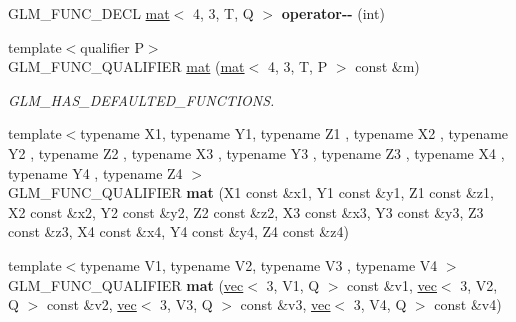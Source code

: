 \begin{DoxyCompactItemize}
G\+L\+M\+\_\+\+F\+U\+N\+C\+\_\+\+D\+E\+CL \hyperlink{structglm_1_1mat}{mat}$<$ 4, 3, T, Q $>$ {\bfseries operator-\/-\/} (int)
\item 
\mbox{\label{structglm_1_1mat_3_014_00_013_00_01T_00_01Q_01_4_af535eb7ce78a7ae068672295b3f5390b}} 
{\footnotesize template$<$qualifier P$>$ }\\G\+L\+M\+\_\+\+F\+U\+N\+C\+\_\+\+Q\+U\+A\+L\+I\+F\+I\+ER \hyperlink{structglm_1_1mat_3_014_00_013_00_01T_00_01Q_01_4_af535eb7ce78a7ae068672295b3f5390b}{mat} (\hyperlink{structglm_1_1mat}{mat}$<$ 4, 3, T, P $>$ const \&m)
\begin{DoxyCompactList}\small\item\em G\+L\+M\+\_\+\+H\+A\+S\+\_\+\+D\+E\+F\+A\+U\+L\+T\+E\+D\+\_\+\+F\+U\+N\+C\+T\+I\+O\+NS. \end{DoxyCompactList}\item 
\mbox{\label{structglm_1_1mat_3_014_00_013_00_01T_00_01Q_01_4_a5b9b02c2c06734a82ab34e55ae7b0888}} 
{\footnotesize template$<$typename X1, typename Y1, typename Z1 , typename X2 , typename Y2 , typename Z2 , typename X3 , typename Y3 , typename Z3 , typename X4 , typename Y4 , typename Z4 $>$ }\\G\+L\+M\+\_\+\+F\+U\+N\+C\+\_\+\+Q\+U\+A\+L\+I\+F\+I\+ER {\bfseries mat} (X1 const \&x1, Y1 const \&y1, Z1 const \&z1, X2 const \&x2, Y2 const \&y2, Z2 const \&z2, X3 const \&x3, Y3 const \&y3, Z3 const \&z3, X4 const \&x4, Y4 const \&y4, Z4 const \&z4)
\item 
\mbox{\label{structglm_1_1mat_3_014_00_013_00_01T_00_01Q_01_4_a3b984142f3f6b6fa9c8a6856445cf4f4}} 
{\footnotesize template$<$typename V1, typename V2, typename V3 , typename V4 $>$ }\\G\+L\+M\+\_\+\+F\+U\+N\+C\+\_\+\+Q\+U\+A\+L\+I\+F\+I\+ER {\bfseries mat} (\hyperlink{structglm_1_1vec}{vec}$<$ 3, V1, Q $>$ const \&v1, \hyperlink{structglm_1_1vec}{vec}$<$ 3, V2, Q $>$ const \&v2, \hyperlink{structglm_1_1vec}{vec}$<$ 3, V3, Q $>$ const \&v3, \hyperlink{structglm_1_1vec}{vec}$<$ 3, V4, Q $>$ const \&v4)
\item 
\mbox{\label{structglm_1_1mat_3_014_00_013_00_01T_00_01Q_01_4_aefc384465c756b6a4bd2da27ed35acf4}} 

\end{DoxyCompactItemize}
